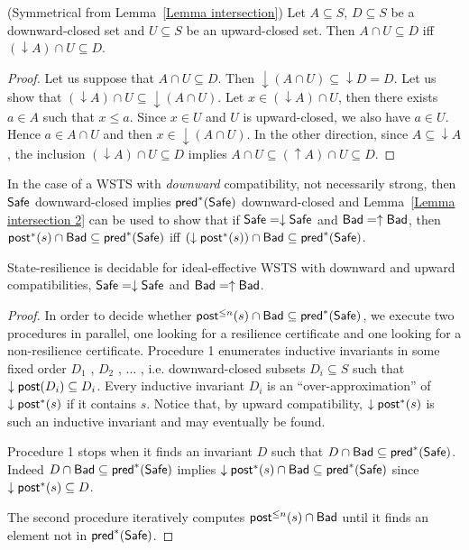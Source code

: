 \begin{lemma}(Symmetrical from Lemma~\ref{Lemma intersection})\label{Lemma intersection 2}
Let $A \subseteq S$, $D \subseteq S$ be a downward-closed set and $U \subseteq S$ be an upward-closed set. 
Then $A \cap U \subseteq D$  iff $ (\downarrow  A) \cap U \subseteq D$.
\end{lemma}

\begin{proof}
Let us suppose that $A \cap U \subseteq D$. Then ${\downarrow (A \cap U)} \subseteq {\downarrow D} = D$. Let us show that $({\downarrow A}) \cap U \subseteq {\downarrow (A \cap U)}$. Let $x \in ({\downarrow A}) \cap U$, then there exists $a \in A$ such that $x \leq a$. Since $x \in U$ and $U$ is upward-closed, we also have $a \in U$. Hence $a \in A \cap U$ and then $x \in { \downarrow (A \cap U)}$. In the other direction, since $A \subseteq {\downarrow A}$, the inclusion $({\downarrow  A}) \cap U \subseteq D$ implies $A \cap U \subseteq ({\uparrow  A}) \cap U \subseteq D$.
\end{proof}


In the case of a WSTS with \emph{downward} compatibility, not necessarily strong,
then $\textsf{Safe}$ downward-closed implies $\textsf{pred}^*(\textsf{Safe})$ downward-closed and
Lemma~\ref{Lemma intersection 2} can be used to show that
if $\textsf{Safe} = \downarrow \textsf{Safe}$ and $\textsf{Bad} = \uparrow \textsf{Bad}$,
then
$\textsf{post}^*(s) \cap \textsf{Bad} \subseteq \textsf{pred}^*(\textsf{Safe})$  iff $ (\downarrow  \textsf{post}^*(s)) \cap \textsf{Bad} \subseteq \textsf{pred}^*(\textsf{Safe})$.


\begin{theorem}\label{downward srp}
{\sc State-resilience} is decidable for ideal-effective WSTS with downward and upward compatibilities,
$\textsf{Safe} = \downarrow \textsf{Safe}$ and $\textsf{Bad} = \uparrow \textsf{Bad}$.
\end{theorem}

\begin{proof}
In order to decide whether $\textsf{post}^{\leq n}(s) \cap \textsf{Bad} \subseteq \textsf{pred}^*(\textsf{Safe})$, we execute two procedures in parallel,
one looking for a resilience certificate and one looking for a non-resilience certificate.
Procedure 1 enumerates inductive invariants in some fixed order $D_1$ , $D_2$ , $\ldots$ , i.e. downward-closed subsets $D_i \subseteq S$ such that $\downarrow \textsf{post}(D_i ) \subseteq D_i$. 
Every inductive invariant $D_i$ is an “over-approximation” of $\downarrow \textsf{post}^*(s)$ if it contains $s$.
Notice that, by 
upward compatibility, $\downarrow \textsf{post}^*(s)$ is such an inductive invariant and may eventually be found.

Procedure 1 stops when it finds an invariant $D$ such that
$D  \cap \textsf{Bad} \subseteq \textsf{pred}^*(\textsf{Safe})$. 
Indeed
$D  \cap \textsf{Bad} \subseteq  \textsf{pred}^*(\textsf{Safe})$ implies
$\downarrow \textsf{post}^*(s) \cap \textsf{Bad} \subseteq  \textsf{pred}^*(\textsf{Safe})$
since $ \downarrow \textsf{post}^*(s)  \subseteq D$.

The second procedure iteratively computes
$\textsf{post}^{\leq n}(s) \cap \textsf{Bad}$
until it finds an element
not in $\textsf{pred}^*(\textsf{Safe})$.
\end{proof}

